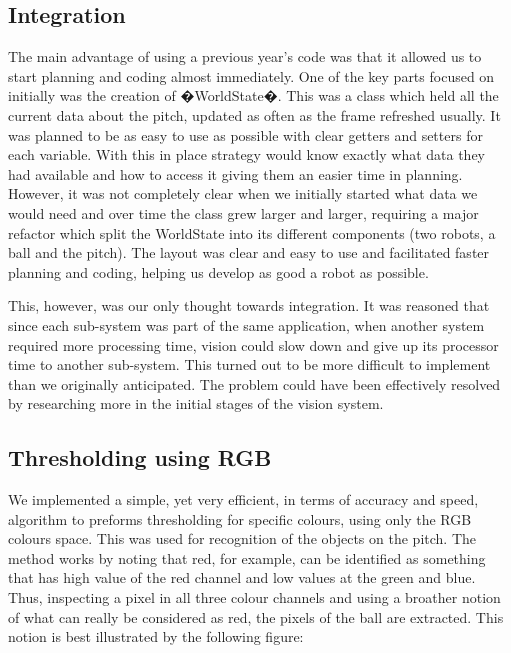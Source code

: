\subsection{Integration}

The main advantage of using a previous year's code was that it allowed us to start planning and coding almost immediately. One of the key parts focused on initially was the creation of �WorldState�. This was a class which held all the current data about the pitch, updated as often as the frame refreshed usually. It was planned to be as easy to use as possible with clear getters and setters for each variable. With this in place strategy would know exactly what data they had available and how to access it giving them an easier time in planning. However, it was not completely clear when we initially started what data we would need and over time the class grew larger and larger, requiring a major refactor which split the WorldState into its different components (two robots, a ball and the pitch). The layout was clear and easy to use and facilitated faster planning and coding, helping us develop as good a robot as possible.

This, however, was our only thought towards integration. It was reasoned that since each sub-system was part of the same application, when another system required more processing time, vision could slow down and give up its processor time to another sub-system. This turned out to be more difficult to implement than we originally anticipated. The problem could have been effectively resolved by researching more in the initial stages of the vision system.

\subsection{Thresholding using RGB}
\label{sec:thresh}

We implemented a simple, yet very efficient, in terms of accuracy and speed, algorithm to preforms thresholding for specific colours, using only the RGB colours space. This was used for recognition of the objects on the pitch. The method works by noting that red, for example, can be identified as something that has high value of the red channel and low values at the green and blue.  Thus, inspecting a pixel in all three colour channels and using a broather notion of what can really be considered as red, the pixels of the ball are extracted. This notion is best illustrated by the following figure: 



